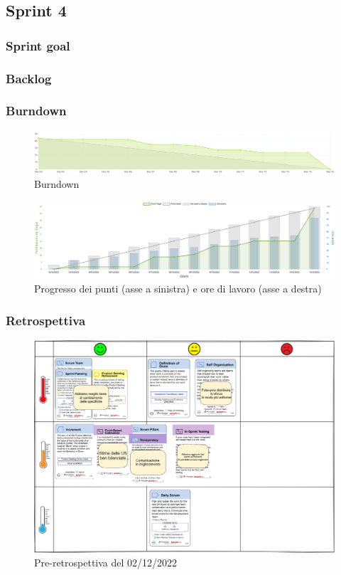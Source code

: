 \documentclass[11pt]{article}
\begin{document}
\subsection{Sprint 4}
\subsubsection{Sprint goal}
\subsubsection{Backlog}
\subsubsection{Burndown}
\begin{figure}[H]
    \centering
    \includegraphics[width=15cm]{./img/sprint4/burndown.png}
    \caption{Burndown}
\end{figure}
\begin{figure}[H]
    \centering
    \includegraphics[width=15cm]{./img/sprint4/worktime.png}
    \caption{Progresso dei punti (asse a sinistra) e ore di lavoro (asse a destra)}
\end{figure}
\subsubsection{Retrospettiva}
\begin{figure}[H]
    \centering
    \includegraphics[width=15cm]{./img/sprint4/retrospettiva.png}
    \caption{Pre-retrospettiva del 02/12/2022}
\end{figure}
\end{document}

